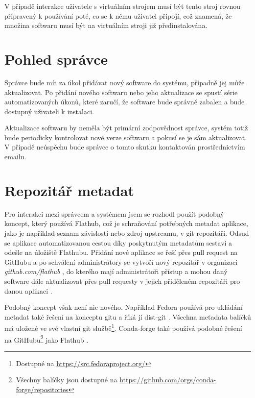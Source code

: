 \documentclass[
  digital,     %
  oneside,     %
  nosansbold,  %
  nocolorbold, %
  lof,         %
  lot,         %
]{fithesis4}
\begin{document}
V případě interakce uživatele s virtuálním strojem musí být tento stroj rovnou
připravený k používání poté, co se k němu uživatel připojí, což znamená, že
množina softwaru musí být na virtuálním stroji již předinstalována.


\section{Pohled správce}

Správce bude mít za úkol přidávat nový software do systému, případně jej
může aktualizovat. Po přidání nového softwaru nebo jeho aktualizace se
spustí série automatizovaných úkonů, které zaručí, že software bude
správně zabalen a bude dostupný uživateli k instalaci.

Aktualizace softwaru by neměla být primární zodpovědnost správce, systém
totiž bude periodicky kontrolovat nové verze softwaru a pokusí se je
sám aktualizovat. V případě neúspěchu bude správce o tomto skutku
kontaktován prostřednictvím emailu.


\section{Repozitář metadat}

Pro interakci mezi správcem a systémem jsem se rozhodl použít podobný
koncept, který používá Flathub, což je schraňování potřebných metadat
aplikace, jako je například seznam závislostí nebo zdroj upstreamu, v
git repozitáři. Odsud se aplikace automatizovanou cestou díky
poskytnutým metadatům sestaví a odešle na úložiště Flathubu.
Přidání nové aplikace se řeší přes pull request na GitHubu 
a po schválení administrátory se vytvoří nový repozitář v organizaci
\textit{github.com/flathub}
\cite{flatpak_app_creation, flatpak_app_repo, flatpak_app_build}, do
kterého mají administrátoři přístup a mohou daný software dále
aktualizovat přes pull requesty v jejich přiděleném repozitáři pro
danou aplikaci \cite{flatpak_app_update}.

Podobný koncept však není nic nového. Například Fedora používá pro
ukládání metadat také řešení na konceptu gitu a říká jí 
dist-git \cite{dist-git}. Všechna metadata balíčků má uložené ve
své vlastní git službě\footnote{Dostupné na 
\url{https://src.fedoraproject.org/}}. Conda-forge také používá
podobné řešení na GitHubu\footnote{Všechny balíčky jsou dostupné
na \url{https://github.com/orgs/conda-forge/repositories}} jako
Flathub \cite{conda-forge_repo_creation}.
\end{document}
